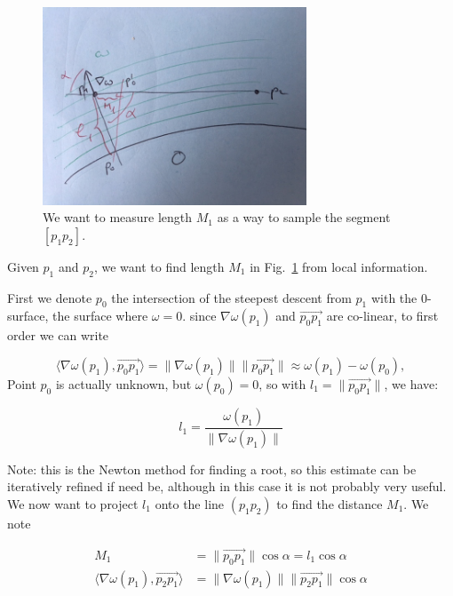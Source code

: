 \documentclass[11pt,a4paper]{article}
\newcommand{\gvec}[1]{\ensuremath{\overset{\rightarrow}{#1}}}
\newcommand{\scal}[2]{\ensuremath{\langle #1 , #2 \rangle}}
\begin{document}
\begin{figure}
	\centering
	\includegraphics[width=0.7\textwidth]{Images/blue_doodle.jpg}
	\caption{We want to measure length $M_1$ as a way to sample the segment $[p_1p_2]$.\label{fig:findM}}
\end{figure}


Given $p_1$ and $p_2$, we want to find length $M_1$ in Fig.~\ref{fig:findM} from local information.

First we denote $p_0$ the intersection of the steepest descent from $p_1$ with the 0-surface, the surface where $\omega=0$.  since $\nabla \omega(p_1)$ and $\gvec{p_0p_1}$ are co-linear, to first order we can write

\begin{equation}
\scal{\nabla \omega(p_1)}{\gvec{p_0p_1}} = \|\nabla \omega(p_1)\| \|\gvec{p_0p_1}\|  \approx \omega(p_1) - \omega(p_0),
\end{equation}
Point $p_0$ is actually unknown, but $\omega(p_0) = 0$, so with $l_1=\|\gvec{p_0p_1}\|$, we have:

\begin{equation}
l_1 = \frac{\omega(p_1)}{\|\nabla \omega(p_1)\|}
\end{equation}

Note: this is the Newton method for finding a root, so this estimate can be iteratively refined if need be, although in this case it is not probably very useful. We now want to project $l_1$ onto the line $(p_1p_2)$ to find the distance $M_1$. We note

\begin{align}
M_1 & = \|\gvec{p_0p_1}\|\cos \alpha = l_1 \cos \alpha\\
\scal{\nabla \omega(p_1)}{\gvec{p_2p_1}} & = \|\nabla \omega(p_1)\|\|\gvec{p_2p_1}\|\cos \alpha
\end{align}
\end{document}

